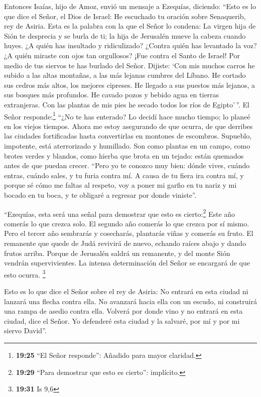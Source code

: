 Entonces Isaías, hijo de Amoz, envió un mensaje a
Ezequías, diciendo: ``Esto es lo que dice el Señor, el Dios de Israel:
He escuchado tu oración sobre Senaquerib, rey de Asiria. 
Esta es la palabra con la que el Señor lo condena: La virgen hija de
Sión te desprecia y se burla de ti; la hija de Jerusalén mueve la cabeza
cuando huyes.  ¿A quién has insultado y ridiculizado?
¿Contra quién has levantado la voz? ¿A quién miraste con ojos tan
orgullosos? ¡Fue contra el Santo de Israel!  Por medio de
tus siervos te has burlado del Señor. Dijiste: `Con mis muchos carros he
subido a las altas montañas, a las más lejanas cumbres del Líbano. He
cortado sus cedros más altos, los mejores cipreses. He llegado a sus
puestos más lejanos, a sus bosques más profundos.  He
cavado pozos y bebido agua en tierras extranjeras. Con las plantas de
mis pies he secado todos los ríos de Egipto'\,''.  El
Señor responde:\footnote{\textbf{19:25} ``El Señor responde'': Añadido
  para mayor claridad.} ``¿No te has enterado? Lo decidí hace mucho
tiempo; lo planeé en los viejos tiempos. Ahora me estoy asegurando de
que ocurra, de que derribes las ciudades fortificadas hasta convertirlas
en montones de escombros.  Supueblo, impotente, está
aterrorizado y humillado. Son como plantas en un campo, como brotes
verdes y blandos, como hierba que brota en un tejado: están quemados
antes de que puedan crecer.  ``Pero yo te conozco muy
bien: dónde vives, cuándo entras, cuándo sales, y tu furia contra mí.
 A causa de tu fiera ira contra mí, y porque sé cómo me
faltas al respeto, voy a poner mi garfio en tu nariz y mi bocado en tu
boca, y te obligaré a regresar por donde viniste''.

 ``Ezequías, esta será una señal para demostrar que esto
es cierto:\footnote{\textbf{19:29} ``Para demostrar que esto es
  cierto'': implícito.} Este año comerás lo que crezca solo. El segundo
año comerás lo que crezca por sí mismo. Pero el tercer año sembrarás y
cosecharás, plantarás viñas y comerás su fruto.  El
remanente que quede de Judá revivirá de nuevo, echando raíces abajo y
dando frutos arriba.  Porque de Jerusalén saldrá un
remanente, y del monte Sión vendrán supervivientes. La intensa
determinación del Señor se encargará de que esto ocurra. \footnote{\textbf{19:31}
  Is 9,6}

 Esto es lo que dice el Señor sobre el rey de Asiria: No
entrará en esta ciudad ni lanzará una flecha contra ella. No avanzará
hacia ella con un escudo, ni construirá una rampa de asedio contra ella.
 Volverá por donde vino y no entrará en esta ciudad, dice
el Señor.  Yo defenderé esta ciudad y la salvaré, por mí
y por mi siervo David''.

